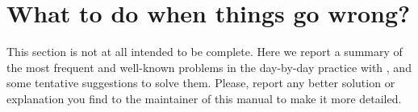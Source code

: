 
\thispagestyle{empty}
\section{What to do when things go wrong?}
\label{sec:troubleshoot}
%
This section is not at all intended to be complete. Here we report
a summary of the most frequent and well-known problems in the
day-by-day practice with \WANT, and some tentative suggestions to
solve them. Please, report any better solution or explanation you
find to the maintainer of this manual to make it more detailed.

